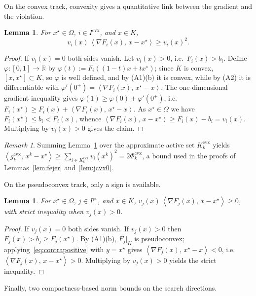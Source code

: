 \documentclass[]{interact}
\theoremstyle{plain}
\newtheorem{lemma}[theorem]{Lemma}
\theoremstyle{definition}
\theoremstyle{remark}
\newtheorem{remark}{Remark}
\newcommand{\R}{\mathbb{R}}
\newcommand{\inner}[2]{\left\langle #1,\, #2 \right\rangle}
\newcommand{\cvx}{\mathrm{cvx}}
\newcommand{\ps}{\mathrm{ps}}
\begin{document}
On the convex track, convexity gives a quantitative link between the gradient and the violation.

\begin{lemma}\label{lem:grad-cvx}
For $x^\star\in\Omega$, $i\in I^{\cvx}$, and $x\in K$,
\[
v_i(x)\,\inner{\nabla F_i(x)}{x-x^\star}\ge v_i(x)^2 .
\]
\end{lemma}
\begin{proof}
If $v_i(x)=0$ both sides vanish. Let $v_i(x)>0$, i.e.\ $F_i(x)>b_i$. Define $\varphi:[0,1]\to\R$ by $\varphi(t):=F_i((1-t)x+tx^\star)$; since $K$ is convex, $[x,x^\star]\subset K$, so $\varphi$ is well defined, and by (A1)(b) it is convex, while by (A2) it is differentiable with $\varphi'(0^+)=\inner{\nabla F_i(x)}{x^\star-x}$. The one-dimensional gradient inequality gives $\varphi(1)\ge\varphi(0)+\varphi'(0^+)$, i.e. $F_i(x^\star)\ge F_i(x)+\inner{\nabla F_i(x)}{x^\star-x}$. As $x^\star\in\Omega$ we have $F_i(x^\star)\le b_i<F_i(x)$, whence $\inner{\nabla F_i(x)}{x-x^\star}\ge F_i(x)-b_i=v_i(x)$. Multiplying by $v_i(x)>0$ gives the claim.
\end{proof}

\begin{remark}\label{rem:grad-cvx-sum}
Summing Lemma~\ref{lem:grad-cvx} over the approximate active set $K^{\cvx}_k$ yields $\inner{g^{\cvx}_k}{x^k-x^\star}\ge\sum_{i\in K^{\cvx}_k}v_i(x^k)^2=2\Phi^{\cvx}_k$, a bound used in the proofs of Lemmas~\ref{lem:fejer} and~\ref{lem:jcvx0}.
\end{remark}

On the pseudoconvex track, only a sign is available.

\begin{lemma}\label{lem:sign-ps}
For $x^\star\in\Omega$, $j\in I^{\ps}$, and $x\in K$, $v_j(x)\,\inner{\nabla F_j(x)}{x-x^\star}\ge 0$, with strict inequality when $v_j(x)>0$.
\end{lemma}
\begin{proof}
If $v_j(x)=0$ both sides vanish. If $v_j(x)>0$ then $F_j(x)>b_j\ge F_j(x^\star)$. By (A1)(b), $F_j|_K$ is pseudoconvex; applying~\eqref{eq:contrapositive} with $y=x^\star$ gives $\inner{\nabla F_j(x)}{x^\star-x}<0$, i.e. $\inner{\nabla F_j(x)}{x-x^\star}>0$. Multiplying by $v_j(x)>0$ yields the strict inequality.
\end{proof}

Finally, two compactness-based norm bounds on the search directions.
\end{document}
